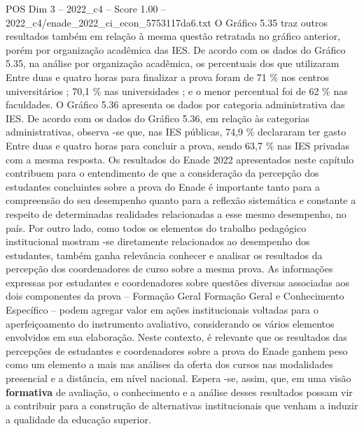 \begin{textsample}{POS Dim 3 – 2022\_c4 – Score 1.00 – 2022\_c4/enade\_2022\_ci\_econ\_5753117da6.txt}
O Gráfico 5.35 traz outros resultados também em relação à mesma questão retratada no gráfico anterior, porém por organização acadêmica das IES.
De acordo com os dados do Gráfico 5.35, na análise por organização acadêmica, os percentuais dos que utilizaram Entre duas e quatro horas para finalizar a prova foram de 71 \% nos centros universitários ; 70,1 \% nas universidades ; e o menor percentual foi de 62 \% nas faculdades.
O Gráfico 5.36 apresenta os dados por categoria administrativa das IES.
De acordo com os dados do Gráfico 5.36, em relação às categorias administrativas, observa -se que, nas IES públicas, 74,9 \% declararam ter gasto Entre duas e quatro horas para concluir a prova, sendo 63,7 \% nas IES privadas com a mesma resposta.
Os resultados do Enade 2022 apresentados neste capítulo contribuem para o entendimento de que a consideração da percepção dos estudantes concluintes sobre a prova do Enade é importante tanto para a compreensão do seu desempenho quanto para a reflexão sistemática e constante a respeito de determinadas realidades relacionadas a esse mesmo desempenho, no país.
Por outro lado, como todos os elementos do trabalho pedagógico institucional mostram -se diretamente relacionados ao desempenho dos estudantes, também ganha relevância conhecer e analisar os resultados da percepção dos coordenadores de curso sobre a mesma prova.
As informações expressas por estudantes e coordenadores sobre questões diversas associadas aos dois componentes da prova – Formação Geral Formação Geral e Conhecimento Específico – podem agregar valor em ações institucionais voltadas para o aperfeiçoamento do instrumento avaliativo, considerando os vários elementos envolvidos em sua elaboração.
Neste contexto, é relevante que os resultados das percepções de estudantes e coordenadores sobre a prova do Enade ganhem peso como um elemento a mais nas análises da oferta dos cursos nas modalidades presencial e a distância, em nível nacional.
Espera -se, assim, que, em uma visão \textbf{formativa} de avaliação, o conhecimento e a análise desses resultados possam vir a contribuir para a construção de alternativas institucionais que venham a induzir a qualidade da educação superior.

\end{textsample}
